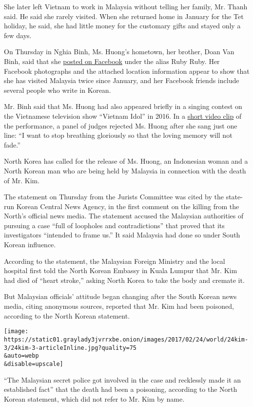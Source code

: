 She later left Vietnam to work in Malaysia without telling her family,
Mr. Thanh said. He said she rarely visited. When she returned home in
January for the Tet holiday, he said, she had little money for the
customary gifts and stayed only a few days.

On Thursday in Nghia Binh, Ms. Huong's hometown, her brother, Doan Van
Binh, said that she
\href{https://www.facebookcorewwwi.onion/profile.php?id=100014435959215\&lst=698293796\%253A100014435959215\%253A1487826179}{posted
on Facebook} under the alias Ruby Ruby. Her Facebook photographs and the
attached location information appear to show that she has visited
Malaysia twice since January, and her Facebook friends include several
people who write in Korean.

Mr. Binh said that Ms. Huong had also appeared briefly in a singing
contest on the Vietnamese television show ``Vietnam Idol'' in 2016. In a
\href{http://www.youtube.com/watch?v=vZNqVandYLA}{short video clip} of
the performance, a panel of judges rejected Ms. Huong after she sang
just one line: ``I want to stop breathing gloriously so that the loving
memory will not fade.''

North Korea has called for the release of Ms. Huong, an Indonesian woman
and a North Korean man who are being held by Malaysia in connection with
the death of Mr. Kim.

The statement on Thursday from the Jurists Committee was cited by the
state-run Korean Central News Agency, in the first comment on the
killing from the North's official news media. The statement accused the
Malaysian authorities of pursuing a case ``full of loopholes and
contradictions'' that proved that its investigators ``intended to frame
us.'' It said Malaysia had done so under South Korean influence.

According to the statement, the Malaysian Foreign Ministry and the local
hospital first told the North Korean Embassy in Kuala Lumpur that Mr.
Kim had died of ``heart stroke,'' asking North Korea to take the body
and cremate it.

But Malaysian officials' attitude began changing after the South Korean
news media, citing anonymous sources, reported that Mr. Kim had been
poisoned, according to the North Korean statement.

\texttt{[image: https://static01.graylady3jvrrxbe.onion/images/2017/02/24/world/24kim-3/24kim-3-articleInline.jpg?quality=75\\\&auto=webp\\\&disable=upscale]}

``The Malaysian secret police got involved in the case and recklessly
made it an established fact'' that the death had been a poisoning,
according to the North Korean statement, which did not refer to Mr. Kim
by name.


